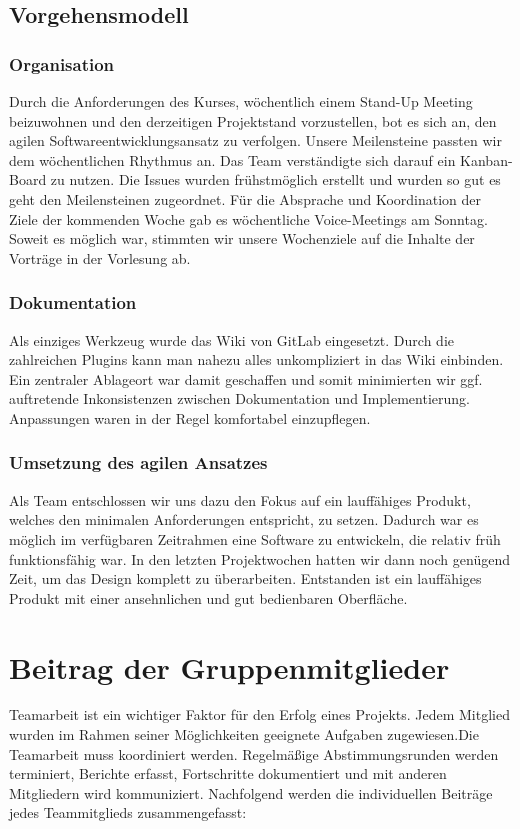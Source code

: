 \documentclass[
  a4paper,
  DIV=10,
  oneside,
  BCOR=5mm,
  parskip=half,
  numbers=noenddot
]{scrreprt}
\begin{document}
\section{Vorgehensmodell}
\subsection{Organisation}
Durch die Anforderungen des Kurses, wöchentlich einem Stand-Up Meeting beizuwohnen und den derzeitigen Projektstand vorzustellen, bot es sich an, den agilen Softwareentwicklungsansatz zu verfolgen. Unsere Meilensteine passten wir dem wöchentlichen Rhythmus an. Das Team verständigte sich darauf ein Kanban-Board zu nutzen. Die Issues wurden frühstmöglich erstellt und wurden so gut es geht den Meilensteinen zugeordnet. Für die Absprache und Koordination der Ziele der kommenden Woche gab es wöchentliche Voice-Meetings am Sonntag. Soweit es möglich war, stimmten wir unsere Wochenziele auf die Inhalte der Vorträge in der Vorlesung ab.

\subsection{Dokumentation}
Als einziges Werkzeug wurde das Wiki von GitLab eingesetzt. Durch die zahlreichen Plugins kann man nahezu alles unkompliziert in das Wiki einbinden. Ein zentraler Ablageort war damit geschaffen und somit minimierten wir ggf. auftretende Inkonsistenzen zwischen Dokumentation und Implementierung. Anpassungen waren in der Regel komfortabel einzupflegen.

\subsection{Umsetzung des agilen Ansatzes}
Als Team entschlossen wir uns dazu den Fokus auf ein lauffähiges Produkt, welches den minimalen Anforderungen entspricht, zu setzen. Dadurch war es möglich im verfügbaren Zeitrahmen eine Software zu entwickeln, die relativ früh funktionsfähig war. In den letzten Projektwochen hatten wir dann noch genügend Zeit, um das Design komplett zu überarbeiten. Entstanden ist ein lauffähiges Produkt mit einer ansehnlichen und gut bedienbaren Oberfläche.

\chapter{Beitrag der Gruppenmitglieder}
Teamarbeit ist ein wichtiger Faktor für den Erfolg eines Projekts. Jedem Mitglied wurden im Rahmen seiner Möglichkeiten geeignete Aufgaben zugewiesen.Die Teamarbeit muss koordiniert werden. Regelmäßige Abstimmungsrunden werden terminiert, Berichte erfasst, Fortschritte dokumentiert und mit anderen Mitgliedern wird kommuniziert. 
Nachfolgend werden die individuellen Beiträge jedes Teammitglieds zusammengefasst:
\end{document}

